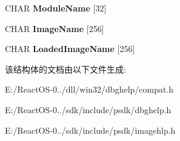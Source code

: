 \begin{DoxyCompactItemize}
C\+H\+AR {\bfseries Module\+Name} \mbox{[}32\mbox{]}
\item 
\mbox{\label{struct___i_m_a_g_e_h_l_p___m_o_d_u_l_e_ab90e76fb398a33b8e188d805dc3589f4}} 
C\+H\+AR {\bfseries Image\+Name} \mbox{[}256\mbox{]}
\item 
\mbox{\label{struct___i_m_a_g_e_h_l_p___m_o_d_u_l_e_ab5f273adbcf13dfc29e180e080180ebe}} 
C\+H\+AR {\bfseries Loaded\+Image\+Name} \mbox{[}256\mbox{]}
\end{DoxyCompactItemize}


该结构体的文档由以下文件生成\+:\begin{DoxyCompactItemize}
\item 
E\+:/\+React\+O\+S-\/0../dll/win32/dbghelp/compat.\+h\item 
E\+:/\+React\+O\+S-\/0../sdk/include/psdk/dbghelp.\+h\item 
E\+:/\+React\+O\+S-\/0../sdk/include/psdk/imagehlp.\+h\end{DoxyCompactItemize}
